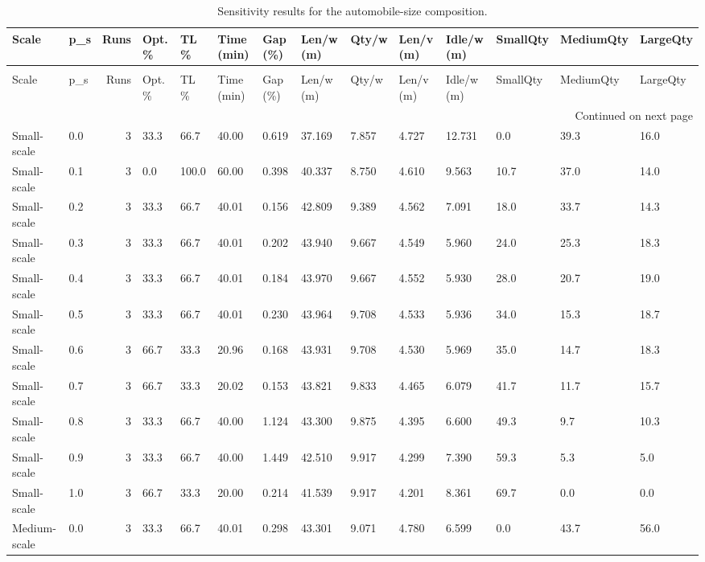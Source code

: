 \begin{longtable}{llrlllllllllll}
\caption{Sensitivity results for the automobile-size composition.} \label{tab:app_composition} \\
\toprule
Scale & p\_s & Runs & Opt. \% & TL \% & Time (min) & Gap (\%) & Len/w (m) & Qty/w & Len/v (m) & Idle/w (m) & SmallQty & MediumQty & LargeQty \\
\midrule
\endfirsthead
\caption[]{Sensitivity results for the automobile-size composition.} \\
\toprule
Scale & p\_s & Runs & Opt. \% & TL \% & Time (min) & Gap (\%) & Len/w (m) & Qty/w & Len/v (m) & Idle/w (m) & SmallQty & MediumQty & LargeQty \\
\midrule
\endhead
\midrule
\multicolumn{14}{r}{Continued on next page} \\
\midrule
\endfoot
\bottomrule
\endlastfoot
Small-scale & 0.0 & 3 & 33.3 & 66.7 & 40.00 & 0.619 & 37.169 & 7.857 & 4.727 & 12.731 & 0.0 & 39.3 & 16.0 \\
Small-scale & 0.1 & 3 & 0.0 & 100.0 & 60.00 & 0.398 & 40.337 & 8.750 & 4.610 & 9.563 & 10.7 & 37.0 & 14.0 \\
Small-scale & 0.2 & 3 & 33.3 & 66.7 & 40.01 & 0.156 & 42.809 & 9.389 & 4.562 & 7.091 & 18.0 & 33.7 & 14.3 \\
Small-scale & 0.3 & 3 & 33.3 & 66.7 & 40.01 & 0.202 & 43.940 & 9.667 & 4.549 & 5.960 & 24.0 & 25.3 & 18.3 \\
Small-scale & 0.4 & 3 & 33.3 & 66.7 & 40.01 & 0.184 & 43.970 & 9.667 & 4.552 & 5.930 & 28.0 & 20.7 & 19.0 \\
Small-scale & 0.5 & 3 & 33.3 & 66.7 & 40.01 & 0.230 & 43.964 & 9.708 & 4.533 & 5.936 & 34.0 & 15.3 & 18.7 \\
Small-scale & 0.6 & 3 & 66.7 & 33.3 & 20.96 & 0.168 & 43.931 & 9.708 & 4.530 & 5.969 & 35.0 & 14.7 & 18.3 \\
Small-scale & 0.7 & 3 & 66.7 & 33.3 & 20.02 & 0.153 & 43.821 & 9.833 & 4.465 & 6.079 & 41.7 & 11.7 & 15.7 \\
Small-scale & 0.8 & 3 & 33.3 & 66.7 & 40.00 & 1.124 & 43.300 & 9.875 & 4.395 & 6.600 & 49.3 & 9.7 & 10.3 \\
Small-scale & 0.9 & 3 & 33.3 & 66.7 & 40.00 & 1.449 & 42.510 & 9.917 & 4.299 & 7.390 & 59.3 & 5.3 & 5.0 \\
Small-scale & 1.0 & 3 & 66.7 & 33.3 & 20.00 & 0.214 & 41.539 & 9.917 & 4.201 & 8.361 & 69.7 & 0.0 & 0.0 \\
Medium-scale & 0.0 & 3 & 33.3 & 66.7 & 40.01 & 0.298 & 43.301 & 9.071 & 4.780 & 6.599 & 0.0 & 43.7 & 56.0 \\

\end{longtable}
